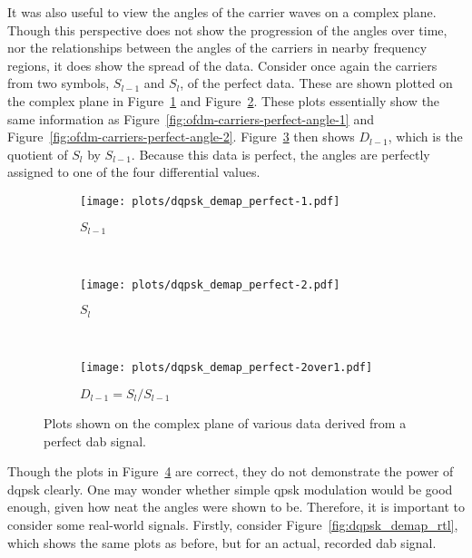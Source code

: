\documentclass[class=report,11pt,crop=false]{standalone}
\begin{document}
It was also useful to view the angles of the carrier waves on a complex plane. Though this perspective does not show the progression of the angles over time, nor the relationships between the angles of the carriers in nearby frequency regions, it does show the spread of the data. Consider once again the carriers from two symbols, \(S_{l-1}\) and \(S_{l}\), of the perfect data. These are shown plotted on the complex plane in Figure~\ref{fig:dqpsk_demap_perfect-1} and Figure~\ref{fig:dqpsk_demap_perfect-2}. These plots essentially show the same information as Figure~\ref{fig:ofdm-carriers-perfect-angle-1} and Figure~\ref{fig:ofdm-carriers-perfect-angle-2}. Figure~\ref{fig:dqpsk_demap_perfect-2over1} then shows \(D_{l-1}\), which is the quotient of \(S_{l}\) by \(S_{l-1}\). Because this data is perfect, the angles are perfectly assigned to one of the four differential values.

\begin{figure}[htbp]
  \centering
  \captionsetup{type=figure}
  \begin{subfigure}[t]{0.3\textwidth}
    \centering
    \captionsetup{type=figure}
    \texttt{[image: plots/dqpsk\_demap\_perfect-1.pdf]}
    \caption{\(S_{l-1}\)}
    \label{fig:dqpsk_demap_perfect-1}
  \end{subfigure}%
  ~ 
  \begin{subfigure}[t]{0.3\textwidth}
    \centering
    \captionsetup{type=figure}
    \texttt{[image: plots/dqpsk\_demap\_perfect-2.pdf]}
    \caption{\(S_{l}\)}
    \label{fig:dqpsk_demap_perfect-2}
  \end{subfigure}
  ~ 
  \begin{subfigure}[t]{0.3\textwidth}
    \centering
    \captionsetup{type=figure}
    \texttt{[image: plots/dqpsk\_demap\_perfect-2over1.pdf]}
    \caption{\(D_{l-1} = S_{l}/S_{l-1}\)}
    \label{fig:dqpsk_demap_perfect-2over1}
  \end{subfigure}
  \caption{Plots shown on the complex plane of various data derived from a perfect \gls{dab} signal.}
  \label{fig:dqpsk_demap_perfect}
\end{figure}

Though the plots in Figure~\ref{fig:dqpsk_demap_perfect} are correct, they do not demonstrate the power of \gls{dqpsk} clearly. One may wonder whether simple \gls{qpsk} modulation would be good enough, given how neat the angles were shown to be. Therefore, it is important to consider some real-world signals. Firstly, consider Figure~\ref{fig:dqpsk_demap_rtl}, which shows the same plots as before, but for an actual, recorded \gls{dab} signal.
\end{document}
